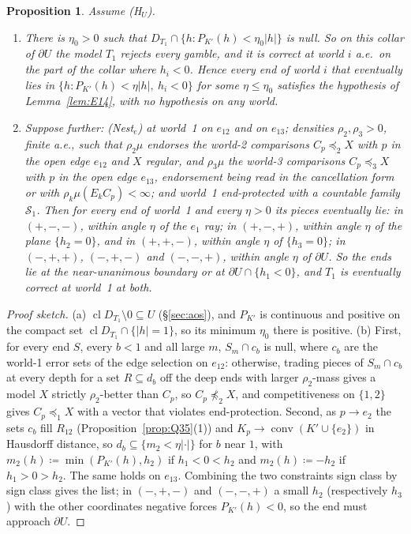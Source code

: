 \documentclass[11pt]{article}
\newtheorem{proposition}[theorem]{Proposition}
\theoremstyle{definition}
\theoremstyle{remark}
\newcommand{\cl}{\operatorname{cl}}
\newcommand{\co}{\operatorname{conv}}
\begin{document}
\begin{proposition}\label{prop:F21}
Assume (H$_U$).
\begin{enumerate}[leftmargin=*,label=(\alph*)]
\item There is $\eta_0>0$ such that $D_{T_1}\cap\{h:P_{K'}(h)<\eta_0|h|\}$ is null. So on this collar of $\partial U$ the model $T_1$ rejects every gamble, and it is correct at world $i$ a.e.\ on the part of the collar where $h_i<0$. Hence every end of world $i$ that eventually lies in $\{h:P_{K'}(h)<\eta|h|,\ h_i<0\}$ for some $\eta\le\eta_0$ satisfies the hypothesis of Lemma~\ref{lem:E14}, with no hypothesis on any world.
\item Suppose further: (Nest$_e$) at world~1 on $e_{12}$ and on $e_{13}$; densities $\rho_2,\rho_3>0$, finite a.e., such that $\rho_2\mu$ endorses the world-2 comparisons $C_p\preceq_2X$ with $p$ in the open edge $e_{12}$ and $X$ regular, and $\rho_3\mu$ the world-3 comparisons $C_p\preceq_3X$ with $p$ in the open edge $e_{13}$, endorsement being read in the cancellation form or with $\rho_k\mu(E_kC_p)<\infty$; and world~1 end-protected with a countable family $\mathcal S_1$. Then for every end of world~1 and every $\eta>0$ its pieces eventually lie: in $(+,-,-)$, within angle $\eta$ of the $e_1$ ray; in $(+,-,+)$, within angle $\eta$ of the plane $\{h_2=0\}$, and in $(+,+,-)$, within angle $\eta$ of $\{h_3=0\}$; in $(-,+,+)$, $(-,+,-)$ and $(-,-,+)$, within angle $\eta$ of $\partial U$. So the ends lie at the near-unanimous boundary or at $\partial U\cap\{h_1<0\}$, and $T_1$ is eventually correct at world~1 at both.
\end{enumerate}
\end{proposition}
\begin{proof}[Proof sketch]
(a) $\cl D_{T_1}\setminus0\subseteq U$ (\S\ref{sec:aos}), and $P_{K'}$ is continuous and positive on the compact set $\cl D_{T_1}\cap\{|h|=1\}$, so its minimum $\eta_0$ there is positive. (b) First, for every end $S$, every $b<1$ and all large $m$, $S_m\cap c_b$ is null, where $c_b$ are the world-1 error sets of the edge selection on $e_{12}$: otherwise, trading pieces of $S_m\cap c_b$ at every depth for a set $R\subseteq d_b$ off the deep ends with larger $\rho_2$-mass gives a model $X$ strictly $\rho_2$-better than $C_p$, so $C_p\not\preceq_2X$, and competitiveness on $\{1,2\}$ gives $C_p\preceq_1X$ with a vector that violates end-protection. Second, as $p\to e_2$ the sets $c_b$ fill $R_{12}$ (Proposition~\ref{prop:Q35}(1)) and $K_p\to\co(K'\cup\{e_2\})$ in Hausdorff distance, so $d_b\subseteq\{m_2<\eta|\cdot|\}$ for $b$ near $1$, with $m_2(h)\coloneqq\min(P_{K'}(h),h_2)$ if $h_1<0<h_2$ and $m_2(h)\coloneqq-h_2$ if $h_1>0>h_2$. The same holds on $e_{13}$. Combining the two constraints sign class by sign class gives the list; in $(-,+,-)$ and $(-,-,+)$ a small $h_2$ (respectively $h_3$) with the other coordinates negative forces $P_{K'}(h)<0$, so the end must approach $\partial U$.
\end{proof}
\end{document}
